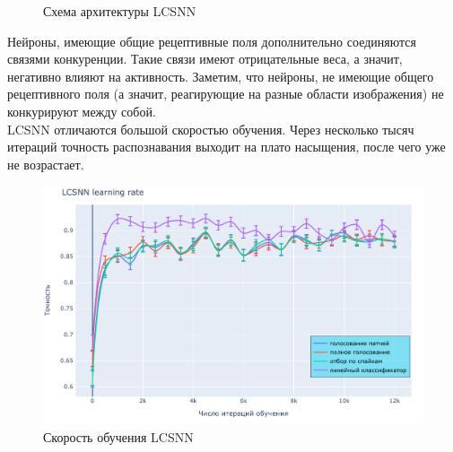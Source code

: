 \documentclass[a4paper]{article}
\begin{document}
\begin{figure}[H]
    \centering
    \def\svgwidth{\columnwidth}
    
    \label{LCSNN}
    \caption{Схема архитектуры LCSNN}
\end{figure}




Нейроны, имеющие общие рецептивные поля дополнительно соединяются связями конкуренции. Такие связи имеют отрицательные веса, а значит, негативно влияют на активность. Заметим, что нейроны, не имеющие общего рецептивного поля (а значит, реагирующие на разные области изображения) не конкурируют между собой.\\
LCSNN отличаются большой скоростью обучения. Через несколько тысяч итераций точность распознавания выходит на плато насыщения, после чего уже не возрастает.

\begin{center}
\begin{figure}[H]
 \includegraphics[width=\textwidth,keepaspectratio=true]{LCSNN_learning_rate_ru.pdf}
 \caption{Скорость обучения LCSNN}
\end{figure}
\end{center}
\end{document}
